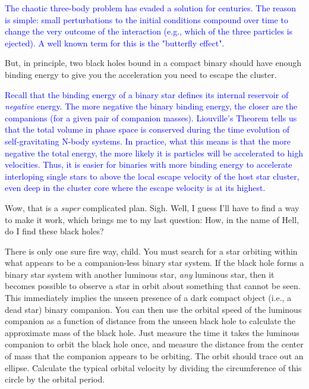 \documentclass[main.tex]{subfiles}
\begin{document}
\begin{tcolorbox}[sharp corners, colback=blue!30, colframe=blue!80!blue, title=Chaos and the Three-Body Problem]
\par \textcolor{blue} {The chaotic three-body problem has evaded a solution for centuries.  The reason is simple:  small perturbations to the initial conditions compound over time to change the very outcome of the interaction (e.g., which of the three particles is ejected).  A well known term for this is the "butterfly effect".
} 
\end{tcolorbox} 


\par \Enrico But, in principle, two black holes bound in a compact binary should have enough binding energy to give you the acceleration you need to escape the cluster.

\begin{tcolorbox}[sharp corners, colback=blue!30, colframe=blue!80!blue, title=The Energetics of Escape]
\par \textcolor{blue} {Recall that the binding energy of a binary star defines its internal reservoir of \textit{negative} energy.  The more negative the binary binding energy, the closer are the companions (for a given pair of companion masses).  Liouville's Theorem tells us that the total volume in phase space is conserved during the time evolution of self-gravitating N-body systems.  In practice, what this means is that the more negative the total energy, the more likely it is particles will be accelerated to high velocities.  Thus, it is easier for binaries with more binding energy to accelerate interloping single stars to above the local escape velocity of the host star cluster, even deep in the cluster core where the escape velocity is at its highest.
} 
\end{tcolorbox}   

\par \Sterope Wow, that is a \textit{super} complicated plan.  Sigh.  Well, I guess I'll have to find a way to make it work, which brings me to my last question:  How, in the name of Hell, do I find these black holes?

\par \Enrico There is only one sure fire way, child.  You must search for a star orbiting within what appears to be a companion-less binary star system.  If the black hole forms a binary star system with another luminous star, \textit{any} luminous star, then it becomes possible to observe a star in orbit about something that cannot be seen.  This immediately implies the unseen presence of a dark compact object (i.e., a dead star) binary companion.  You can then use the orbital speed of the luminous companion as a function of distance from the unseen black hole to calculate the approximate mass of the black hole.  Just measure the time it takes the luminous companion to orbit the black hole once, and measure the distance from the center of mass that the companion appears to be orbiting.  The orbit should trace out an ellipse.  Calculate the typical orbital velocity by dividing the circumference of this circle by the orbital period.
\end{document}

